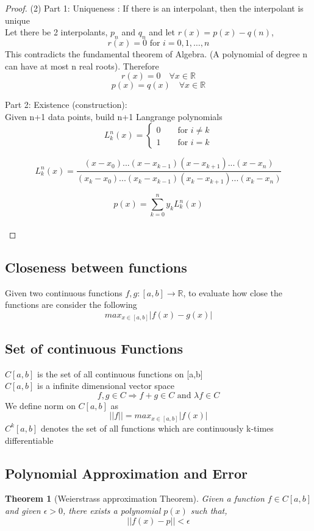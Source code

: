 \documentclass{article}
\newtheorem*{theorem}{Theorem}
\begin{document}
	\begin{proof}
		(2)  Part 1: Uniqueness : If there is an interpolant, then the interpolant is unique\\
		Let there be 2 interpolants, $p_n$ and $q_n$ and let $r(x)=p(x)-q(n)$,\\
		\[r(x)=0 \text{ for } i=0,1,\hdots,n\] 
		This contradicts the fundamental theorem of Algebra. (A polynomial of degree n can have at most n real roots). Therefore 
		\[r(x)=0 \quad \forall x \in \mathbb{R}\]
		\[p(x)=q(x) \quad \forall x \in \mathbb{R}\]

		\noindent Part 2: Existence (construction):\\
			Given n+1 data points, build n+1 Langrange polynomials 
			\[L^n_k (x) =
			\begin{cases}
			 0 \qquad \text{for } i\neq k \\
			 1 \qquad \text{for } i=k
			\end{cases}
			 \]

		\[L^n_k(x)= \frac{(x-x_0)...(x-x_{k-1})(x-x_{k+1})...(x-x_n)}{(x_k-x_0)...(x_k-x_{k-1})(x_k-x_{k+1})...(x_k-x_n)}\]

		\[p(x) = \sum_{k=0}^n y_k L^n_k(x)\]\\
	\end{proof}

\subsection{Closeness between functions}
	Given two continuous functions $f,g:[a,b]\rightarrow \mathbb{R}$, to evaluate how close the functions are consider the following
	\[max_{x\in [a,b]} |f(x)-g(x)|\]


\subsection{Set of continuous Functions}
	$C[a,b]$ is the set of all continuous functions on [a,b]\\
	$C[a,b]$ is a infinite dimensional vector space
	\[f,g \in C \Longrightarrow f+g \in C \text{  and  }\lambda f\in C\]
	We define norm on $C[a,b]$ as
	\[||f|| = max_{x\in [a,b]} |f(x)|\]
	$C^{k}[a,b]$ denotes the set of all functions which are continuously k-times differentiable  



\subsection{Polynomial Approximation and Error}
	\begin{theorem}[Weierstrass approximation Theorem]
	\label{weierstrass}
		Given a function $f\in C[a,b]$ and given $\epsilon>0$, there exists a polynomial $p(x)$ such that,
		\[||f(x)-p||<\epsilon\]
	\end{theorem}
\end{document}
